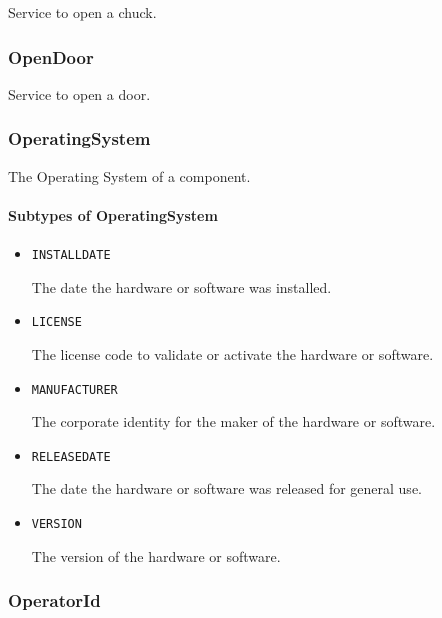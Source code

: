 Service to open a chuck.



\subsubsection{OpenDoor}
\label{sec:OpenDoor}



Service to open a door.



\subsubsection{OperatingSystem}
\label{sec:OperatingSystem}



The Operating System of a component.


\paragraph{Subtypes of OperatingSystem}\mbox{}
\label{sec:Subtypes of OperatingSystem}

\begin{itemize}

\item \texttt{INSTALL\textunderscore DATE}


The date the hardware or software was installed.

\item \texttt{LICENSE}


The license code to validate or activate the hardware or software.

\item \texttt{MANUFACTURER}


The corporate identity for the maker of the hardware or software.


\item \texttt{RELEASE\textunderscore DATE}


The date the hardware or software was released for general use.


\item \texttt{VERSION}


The version of the hardware or software.


\end{itemize}








\subsubsection{OperatorId}
\label{sec:OperatorId}



